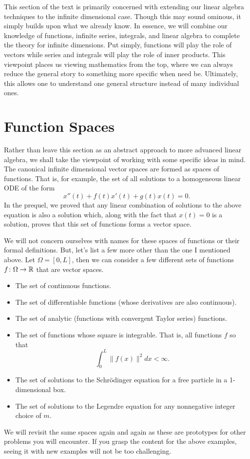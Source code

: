 This section of the text is primarily concerned with extending our linear algebra techniques to the infinite dimensional case.  Though this may sound ominous, it simply builds upon what we already know.  In essence, we will combine our knowledge of functions, infinite series, integrals, and linear algebra to complete the theory for infinite dimensions.  Put simply, functions will play the role of vectors while series and integrals will play the role of inner products.  This viewpoint places us viewing mathematics from the top, where we can always reduce the general story to something more specific when need be. Ultimately, this allows one to understand one general structure instead of many individual ones.

\section{Function Spaces}

Rather than leave this section as an abstract approach to more advanced linear algebra, we shall take the viewpoint of working with some specific ideas in mind.  The canonical infinite dimensional vector spaces are formed as spaces of functions.  That is, for example, the set of all solutions to a homogeneous linear ODE of the form
\[
x''(t)+f(t)x'(t)+g(t)x(t)=0.
\]
In the prequel, we proved that any linear combination of solutions to the above equation is also a solution which, along with the fact that $x(t)=0$ is a solution, proves that this set of functions forms a vector space.  

We will not concern ourselves with names for these spaces of functions or their formal definitions.  But, let's list a few more other than the one I mentioned above. Let $\Omega=[0,L]$, then we can consider a few different sets of functions $f\colon \Omega \to \mathbb{R}$ that are vector spaces.
\begin{itemize}
	\item The set of continuous functions.
	\item The set of differentiable functions (whose derivatives are also continuous).
	\item The set of analytic (functions with convergent Taylor series) functions.
	\item The set of functions whose square is integrable. That is, all functions $f$ so that
	\[
		\int_0^L \|f(x)\|^2 dx <\infty.
	\]
	\item The set of solutions to the Schr\"odinger equation for a free particle in a 1-dimensional box.
	\item The set of solutions to the Legendre equation for any nonnegative integer choice of $m$.
\end{itemize}
We will revisit the same spaces again and again as these are prototypes for other problems you will encounter. If you grasp the content for the above examples, seeing it with new examples will not be too challenging.

